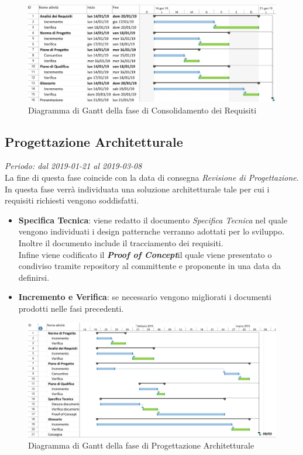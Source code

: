\begin{figure}[H]
	\label{fig:gantt_con}
	\includegraphics[width=0.99\linewidth]{res/images/gantt_cons.jpg}
	\caption{Diagramma di Gantt della fase di Consolidamento dei Requisiti}
\end{figure}

\subsection{Progettazione Architetturale}
\textit{Periodo: dal 2019-01-21 al 2019-03-08} \\
La fine di questa fase coincide con la data di consegna \textit{Revisione di 
Progettazione}. In questa fase verrà individuata una soluzione architetturale 
tale per cui i requisiti richiesti vengono soddisfatti.
\begin{itemize}
	\item \textbf{Specifica Tecnica}: viene redatto il documento 
	\textit{Specifica Tecnica} nel quale vengono individuati i design 
	pattern\glosp che verranno adottati per lo sviluppo. Inoltre il documento 
	include il tracciamento dei requisiti.\\
	Infine viene codificato il \textbf{\textit{Proof of Concept}}\glosp il 
	quale viene presentato o condiviso tramite repository al committente e 
	proponente in una data da definirsi.
	\item \textbf{Incremento e Verifica}: se necessario vengono migliorati i 
	documenti prodotti nelle fasi precedenti.
\end{itemize}

\begin{figure}[H]
	\includegraphics[width=0.99\linewidth]{res/images/gantt_pa.jpg}
	\caption{Diagramma di Gantt della fase di Progettazione Architetturale}
\end{figure}


